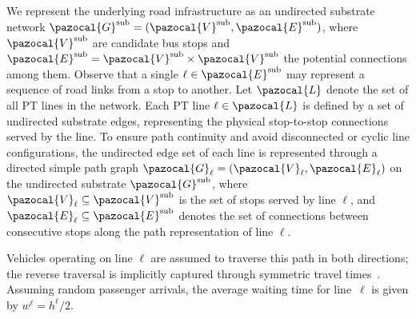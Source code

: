\documentclass[11pt,a4paper]{article} %
\begin{document}
\subsection{}
We represent the underlying road infrastructure as an undirected substrate network $\pazocal{G}^{\text{sub}} = (\pazocal{V}^{\text{sub}}, \pazocal{E}^{\text{sub}})$, where $\pazocal{V}^{\text{sub}}$ are candidate bus stops and $\pazocal{E}^{\text{sub}} = \pazocal{V}^{\text{sub}} \times \pazocal{V}^{\text{sub}}$ the potential connections among them. Observe that a single $\ell \in \pazocal{E}^{\text{sub}}$ may represent a sequence of road links from a stop to another. Let $\pazocal{L}$ denote the set of all PT lines in the network. Each PT line $\ell \in \pazocal{L}$ is defined by a set of undirected substrate edges, representing the physical stop-to-stop connections served by the line. To ensure path continuity and avoid disconnected or cyclic line configurations, the undirected edge set of each line is represented through a directed simple path graph $\pazocal{G}_\ell = (\pazocal{V}_\ell, \pazocal{E}_\ell)$ on the undirected substrate $\pazocal{G}^{\text{sub}}$, where $\pazocal{V}_\ell \subseteq \pazocal{V}^{\text{sub}}$ is the set of stops served by line $\ell$, and $\pazocal{E}_\ell \subseteq \pazocal{E}^{\text{sub}}$ denotes the set of connections between consecutive stops along the path representation of line $\ell$.


Vehicles operating on line $\ell$ are assumed to traverse this path in both directions; the reverse traversal is implicitly captured through symmetric travel times~\citep{schmid2014hybrid}.  Assuming random passenger arrivals, the average waiting time for line~$\ell$ is given by $w^\ell=h^\ell/2$. 
\end{document}
